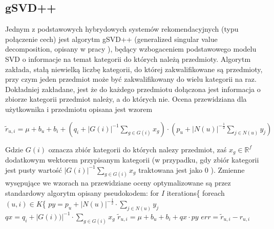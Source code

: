 \documentclass{pracamgr}
\begin{document}
   \subsection{gSVD++}
    Jednym z podstawowych hybrydowych systemów rekomendacyjnych (typu połączenie cech) jest algorytm gSVD++
    (generalized singular value decomposition, opisany w pracy \cite{gSVD++}),
    będący wzbogaceniem podstawowego modelu SVD o informacje na temat kategorii do których należą przedmioty.
    Algorytm zakłada, stałą niewielką liczbę kategorii, do której zakwalifikowane są przedmioty, przy czym jeden przedmiot może być zakwalifikowany do wielu
    kategorii na raz.
    Dokładniej zakładane, jest że do każdego przedmiotu dołączona jest informacja o zbiorze kategorii przedmiot należy, a do których nie.\newline
    Ocena przewidziana dla użytkownika i przedmiotu opisana jest wzorem
    \begin{center}
     $\tilde{r}_{u,i}=\mu+b_u+b_i+\left(q_i+|G(i)|^{-1}\sum\limits_{g\in G(i)}x_{g}\right)\cdot\left(p_u +|N(u)|^{-\frac{1}{2}}\sum\limits_{j\in N(u)}y_j\right)$
    \end{center}
    Gdzie $G(i)$ oznacza zbiór kategorii do których nalezy przedmiot, zaś $x_{g}\in\mathbb{R}^f$ dodatkowym wektorem przypisanym kategorii
    (w przypadku, gdy zbiór kategorii jest pusty wartość $|G(i)|^{-1}\sum\limits_{g\in G(i)}x_{g}$ traktowana jest jako $0$ ).
    Zmienne wysępujące we wzorach na przewidziane oceny optymalizowane są przez standardowy algorytm opisany pseudokodem:\newline
    \hspace*{16pt}	for $I$ iterations\{\newline
    \hspace*{32pt}		foreach $(u,i)\in K$\{\newline
    \hspace*{48pt}			$py=p_u +|N(u)|^{-\frac{1}{2}}\cdot\sum\limits_{j\in N(u)}y_j$\newline
    \hspace*{48pt}			$qx=q_i +|G(i))|^{-1}\cdot\sum\limits_{g\in G(i)}x_g$\newline
    \hspace*{48pt}			$\tilde{r}_{u,i}=\mu+b_u+b_i+qx\cdot py$\newline
    \hspace*{48pt}			$err=\tilde{r}_{u,i}-r_{u,i}$\newline
\end{document}
